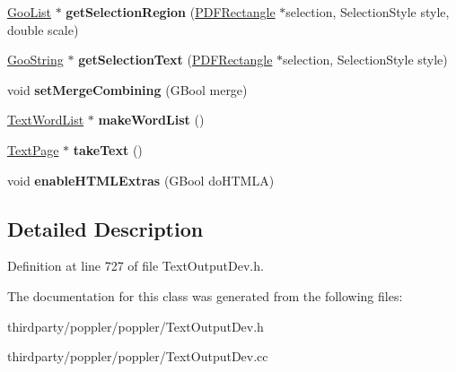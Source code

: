 \begin{DoxyCompactItemize}
\item 
\mbox{\label{class_text_output_dev_ad4c05017c1b4eff16c837a8e55320854}} 
\hyperlink{class_goo_list}{Goo\+List} $\ast$ {\bfseries get\+Selection\+Region} (\hyperlink{class_p_d_f_rectangle}{P\+D\+F\+Rectangle} $\ast$selection, Selection\+Style style, double scale)
\item 
\mbox{\label{class_text_output_dev_a0e97dad2905478cb22aafdb75f7b8cd1}} 
\hyperlink{class_goo_string}{Goo\+String} $\ast$ {\bfseries get\+Selection\+Text} (\hyperlink{class_p_d_f_rectangle}{P\+D\+F\+Rectangle} $\ast$selection, Selection\+Style style)
\item 
\mbox{\label{class_text_output_dev_aa110ae5630329c1edfa1b719e27820b8}} 
void {\bfseries set\+Merge\+Combining} (G\+Bool merge)
\item 
\mbox{\label{class_text_output_dev_a6e1af12a34657ddf4d9d4e132067202b}} 
\hyperlink{class_text_word_list}{Text\+Word\+List} $\ast$ {\bfseries make\+Word\+List} ()
\item 
\mbox{\label{class_text_output_dev_a41bad49580ada73399f3f166bca22804}} 
\hyperlink{class_text_page}{Text\+Page} $\ast$ {\bfseries take\+Text} ()
\item 
\mbox{\label{class_text_output_dev_abedf3f7f6a4faf84806a000a30d1a7bb}} 
void {\bfseries enable\+H\+T\+M\+L\+Extras} (G\+Bool do\+H\+T\+M\+LA)
\end{DoxyCompactItemize}


\subsection{Detailed Description}


Definition at line 727 of file Text\+Output\+Dev.\+h.



The documentation for this class was generated from the following files\+:\begin{DoxyCompactItemize}
\item 
thirdparty/poppler/poppler/Text\+Output\+Dev.\+h\item 
thirdparty/poppler/poppler/Text\+Output\+Dev.\+cc\end{DoxyCompactItemize}
